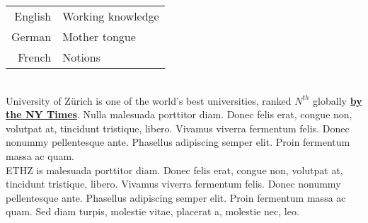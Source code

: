 \documentclass[theme]{cv_einstein}
\begin{document}
\begin{paracol}{2}
\begin{leftcolumn*}
{            
            \begin{minipage}[r]{\leftcolwidth}
                \begin{tabular}{r|l}
                    English & Working knowledge\\[0.3em]
                    German & Mother tongue\\[0.3em]
                    French & Notions
                \end{tabular}
            \end{minipage}
            \vspace{\sectionspace}
        }
        \end{leftcolumn*}
        \begin{rightcolumn}\noindent \small
            \phantom{} \\ %
            {University of Zürich is one of the world's best universities, ranked $N^{th}$ globally \href{http://example.com}{\textbf{by the NY Times}}.
            Nulla malesuada porttitor diam. Donec felis erat, congue non, volutpat at, tincidunt tristique, libero. Vivamus viverra fermentum felis. Donec nonummy pellentesque ante. Phasellus adipiscing semper elit. Proin fermentum massa ac quam.}
            \vspace{\itemspace}\\
            {ETHZ is malesuada porttitor diam. Donec felis erat, congue non, volutpat at, tincidunt tristique, libero. Vivamus viverra fermentum felis. Donec nonummy pellentesque ante. Phasellus adipiscing semper elit. Proin fermentum massa ac quam. Sed diam turpis, molestie vitae, placerat a, molestie nec, leo.}
        \vspace{\sectionspace}

\end{rightcolumn}
\end{paracol}
\end{document}
